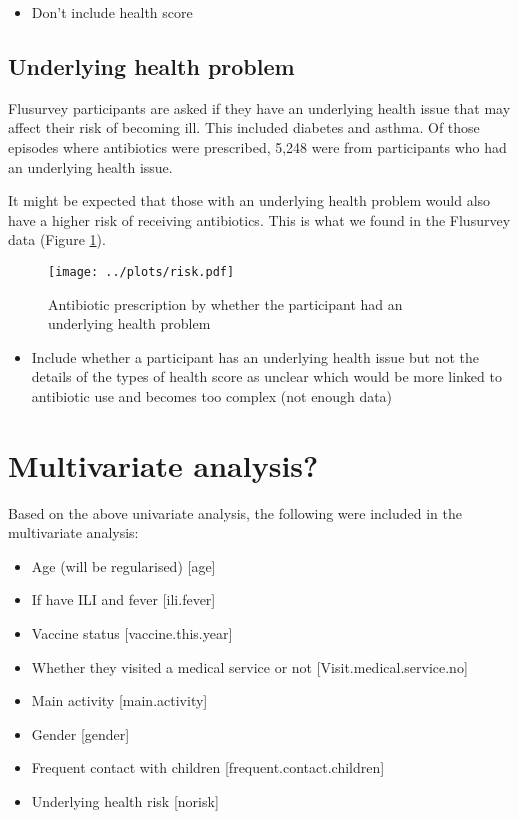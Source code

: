 \documentclass{article}
\begin{document}
\begin{itemize}
	\item Don't include health score
\end{itemize}

\subsection{Underlying health problem}

Flusurvey participants are asked if they have an underlying health issue that may affect their risk of becoming ill. This included diabetes and asthma. Of those episodes where antibiotics were prescribed, 5,248 were from participants who had an underlying health issue. 

It might be expected that those with an underlying health problem would also have a higher risk of receiving antibiotics. This is what we found in the Flusurvey data (Figure \ref{fig:risk}). 

	\begin{figure}[htbp]
		\centering
		\texttt{[image: ../plots/risk.pdf]}
		\caption{Antibiotic prescription by whether the participant had an underlying health problem}
		\label{fig:risk}
	\end{figure} 

\begin{itemize}
	\item Include whether a participant has an underlying health issue but not the details of the types of health score as unclear which would be more linked to antibiotic use and becomes too complex (not enough data)
\end{itemize}

\clearpage 





\section{Multivariate analysis?}

Based on the above univariate analysis, the following were included in the multivariate analysis: 

\begin{itemize}
	\item Age (will be regularised) [age]
	\item If have ILI and fever [ili.fever]
	\item Vaccine status [vaccine.this.year]
	\item Whether they visited a medical service or not [Visit.medical.service.no]
	\item Main activity [main.activity]
	\item Gender [gender]
	\item Frequent contact with children [frequent.contact.children]
	\item Underlying health risk [norisk]
\end{itemize}
\end{document}
